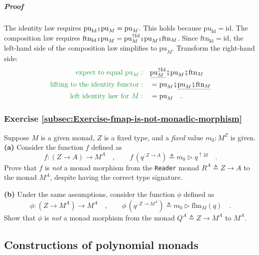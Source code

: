 \subparagraph{Proof}

The identity law requires $\text{pu}_{\text{Id}}\bef\text{pu}_{M}=\text{pu}_{M}$.
This holds because $\text{pu}_{\text{Id}}=\text{id}$. The composition
law requires $\text{ftn}_{\text{Id}}\bef\text{pu}_{M}=\text{pu}_{M}^{\uparrow\text{Id}}\bef\text{pu}_{M}\bef\text{ftn}_{M}$.
Since $\text{ftn}_{\text{Id}}=\text{id}$, the left-hand side of the
composition law simplifies to $\text{pu}_{M}$. Transform the right-hand
side:
\begin{align*}
{\color{greenunder}\text{expect to equal }\text{pu}_{M}:}\quad & \gunderline{\text{pu}_{M}^{\uparrow\text{Id}}}\bef\text{pu}_{M}\bef\text{ftn}_{M}\\
{\color{greenunder}\text{lifting to the identity functor}:}\quad & =\text{pu}_{M}\bef\gunderline{\text{pu}_{M}\bef\text{ftn}_{M}}\\
{\color{greenunder}\text{left identity law for }M:}\quad & =\text{pu}_{M}\quad.
\end{align*}


\subsubsection{Exercise \label{subsec:Exercise-fmap-is-not-monadic-morphism}\ref{subsec:Exercise-fmap-is-not-monadic-morphism}}

Suppose $M$ is a given monad, $Z$ is a fixed type, and a \emph{fixed}
value $m_{0}:M^{Z}$ is given. \textbf{(a)} Consider the function
$f$ defined as
\[
f:\left(Z\rightarrow A\right)\rightarrow M^{A}\quad,\quad\quad f\,(q^{:Z\rightarrow A})\triangleq m_{0}\triangleright q^{\uparrow M}\quad.
\]
Prove that $f$ is \emph{not} a monad morphism from the \lstinline!Reader!
monad $R^{A}\triangleq Z\rightarrow A$ to the monad $M^{A}$, despite
having the correct type signature.

\textbf{(b)} Under the same assumptions, consider the function $\phi$
defined as
\[
\phi:(Z\rightarrow M^{A})\rightarrow M^{A}\quad,\quad\quad\phi\,(q^{:Z\rightarrow M^{A}})\triangleq m_{0}\triangleright\text{flm}_{M}(q)\quad.
\]
Show that $\phi$ is \emph{not} a monad morphism from the monad $Q^{A}\triangleq Z\rightarrow M^{A}$
to $M^{A}$.

\subsection{Constructions of polynomial monads}

